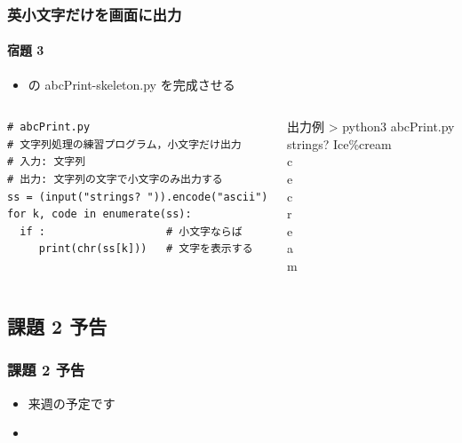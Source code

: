 \begin{frame}
\frametitle{英小文字だけを画面に出力}
\framesubtitle{宿題 3}
  \begin{itemize}
\item \href{https://sites.google.com/presystems.xyz/elementarycs/top}{} の abcPrint-skeleton.py を完成させる
  \end{itemize}
  \begin{columns}
    \begin{column}{0.6\textwidth}
      \begin{lstlisting}[caption={abcPrint.py},label=lst:lowerletterprt]
# abcPrint.py
# 文字列処理の練習プログラム，小文字だけ出力
# 入力: 文字列
# 出力: 文字列の文字で小文字のみ出力する
ss = (input("strings? ")).encode("ascii")
for k, code in enumerate(ss):
  if :                   # 小文字ならば
     print(chr(ss[k]))   # 文字を表示する
      \end{lstlisting}
    \end{column}
    \begin{column}{0.35\textwidth}
      \begin{itembox}{出力例}
\scriptsize
> python3 abcPrint.py\\
strings? Ice\%cream\\
c\\
e\\
c\\
r\\
e\\
a\\
m
      \end{itembox}
    \end{column}
  \end{columns}
\end{frame}
%
%
\subsection{課題 2 予告}
\begin{frame}
\frametitle{課題 2 予告}
  \begin{itemize}
\item 来週の予定です
\item \hyperlink{quiz2}{}
  \end{itemize}
\end{frame}
